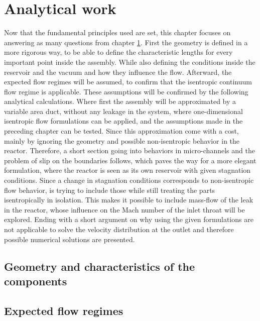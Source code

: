 \section{Analytical work}
	Now that the fundamental principles used are set, this chapter focuses on answering as many questions from chapter \ref{}.
	First the geometry is defined in a more rigorous way, to be able to define the characteristic lengths for every important point inside the assembly.
	While also defining the conditions inside the reservoir and the vacuum and how they influence the flow.
	Afterward, the expected flow regimes will be assumed, to confirm that the isentropic continuum flow regime is applicable.
	These assumptions will be confirmed by the following analytical calculations.
	Where first the assembly will be approximated by a variable area duct, without any leakage in the system, where one-dimensional isentropic flow formulations can be applied, and the assumptions made in the preceding chapter can be tested.
	Since this approximation come with a cost, mainly by ignoring the geometry and possible non-isentropic behavior in the reactor.
	Therefore, a short section going into behaviors in micro-channels and the problem of slip on the boundaries follows, which paves the way for a more elegant formulation, where the reactor is seen as its own reservoir with given stagnation conditions.
	Since a change in stagnation conditions corresponds to non-isentropic flow behavior, is trying to include those while still treating the parts isentropically in isolation.
	This makes it possible to include mass-flow of the leak in the reactor, whose influence on the Mach number of the inlet throat will be explored.
	Ending with a short argument on why using the given formulations are not applicable to solve the velocity distribution at the outlet and therefore possible numerical solutions are presented.

\subsection{Geometry and characteristics of the components}\label{sec:geometry}
	

\subsection{Expected flow regimes}\label{sec:expected-flow-regimes}
	
	\newpage

